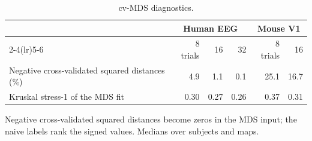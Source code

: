 \documentclass[11pt]{article}
\newcommand{\tablenote}[1]{\par\smallskip\noindent
  \begin{minipage}{\linewidth}\footnotesize\setlength{\parindent}{0pt}#1\end{minipage}}
\begin{document}
\begin{table}[!htb]
\centering\small
\caption{cv-MDS diagnostics.}
\begin{tabular}{lrrrrr}
\toprule
 & \multicolumn{3}{c}{Human EEG} & \multicolumn{2}{c}{Mouse V1} \\
\cmidrule(lr){2-4}\cmidrule(lr){5-6}
 & 8 trials & 16 & 32 & 8 trials & 16 \\
\midrule
Negative cross-validated squared distances (\%) & 4.9 & 1.1 & 0.1 & 25.1 & 16.7 \\
Kruskal stress-1 of the MDS fit & 0.30 & 0.27 & 0.26 & 0.37 & 0.31 \\
\bottomrule
\end{tabular}
\tablenote{Negative cross-validated squared distances become zeros in the MDS input; the naive labels rank the signed values.
Medians over subjects and maps.}
\end{table}
\end{document}
